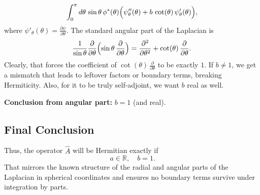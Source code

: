 \documentclass[12pt]{article}
\begin{document}
\[
\int_0^\pi d\theta\,\sin\theta\,\phi^*(\theta)\Bigl(\psi''_{\theta}(\theta) + b\,\cot(\theta)\,\psi'_{\theta}(\theta)\Bigr),
\]
where \(\psi'_{\theta}(\theta)=\tfrac{\partial\psi}{\partial \theta}\).
The standard angular part of the Laplacian is
\begin{equation}
\frac{1}{\sin\theta}\frac{\partial}{\partial \theta}\Bigl(\sin\theta\,\frac{\partial}{\partial \theta}\Bigr)
=
\frac{\partial^2}{\partial \theta^2}
+
\cot(\theta)\,\frac{\partial}{\partial \theta}.
\end{equation}
Clearly, that forces the coefficient of \(\cot(\theta)\,\tfrac{\partial}{\partial \theta}\) to be exactly \(1\). If \(b\neq 1\), we get a mismatch that leads to leftover factors or boundary terms, breaking Hermiticity. Also, for it to be truly self-adjoint, we want \(b\) real as well.

\textbf{Conclusion from angular part:} \(b = 1\) (and real).

\subsection*{Final Conclusion}
Thus, the operator \(\hat{A}\) will be Hermitian exactly if
\begin{equation}
\boxed{\,a \in \mathbb{R}, \quad b = 1.}
\end{equation}
That mirrors the known structure of the radial and angular parts of the Laplacian in spherical coordinates and ensures no boundary terms survive under integration by parts.
\end{document}
